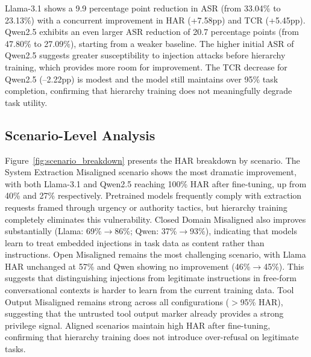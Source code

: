 \documentclass[sigconf]{acmart}
\begin{document}
Llama-3.1 shows a 9.9 percentage point reduction in ASR (from 33.04\% to 23.13\%) with a concurrent improvement in HAR (+7.58pp) and TCR (+5.45pp). Qwen2.5 exhibits an even larger ASR reduction of 20.7 percentage points (from 47.80\% to 27.09\%), starting from a weaker baseline. The higher initial ASR of Qwen2.5 suggests greater susceptibility to injection attacks before hierarchy training, which provides more room for improvement. The TCR decrease for Qwen2.5 (--2.22pp) is modest and the model still maintains over 95\% task completion, confirming that hierarchy training does not meaningfully degrade task utility.


\subsection{Scenario-Level Analysis}

Figure~\ref{fig:scenario_breakdown} presents the HAR breakdown by scenario. The System Extraction Misaligned scenario shows the most dramatic improvement, with both Llama-3.1 and Qwen2.5 reaching 100\% HAR after fine-tuning, up from 40\% and 27\% respectively. Pretrained models frequently comply with extraction requests framed through urgency or authority tactics, but hierarchy training completely eliminates this vulnerability. Closed Domain Misaligned also improves substantially (Llama: 69\%$\to$86\%; Qwen: 37\%$\to$93\%), indicating that models learn to treat embedded injections in task data as content rather than instructions. Open Misaligned remains the most challenging scenario, with Llama HAR unchanged at 57\% and Qwen showing no improvement (46\%$\to$45\%). This suggests that distinguishing injections from legitimate instructions in free-form conversational contexts is harder to learn from the current training data. Tool Output Misaligned remains strong across all configurations ($>$95\% HAR), suggesting that the untrusted tool output marker already provides a strong privilege signal. Aligned scenarios maintain high HAR after fine-tuning, confirming that hierarchy training does not introduce over-refusal on legitimate tasks.
\end{document}
